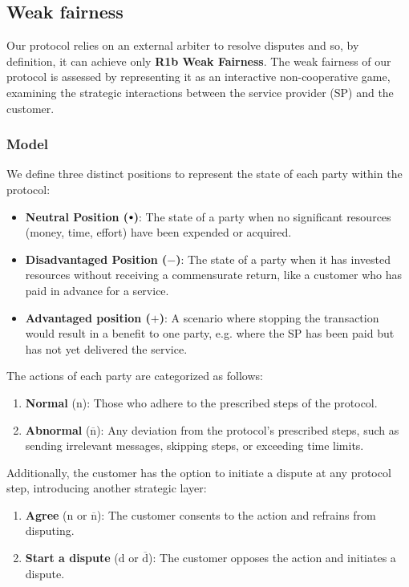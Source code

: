 \documentclass[pdftex,twocolumn,epjc3]{svjour3}
\newcommand{\normal}{\mathrm{n}}
\newcommand{\dispute}{\mathrm{d}}
\newcommand{\abnormal}{\overline{\mathrm{n}}}
\newcommand{\abdispute}{\overline{\mathrm{d}}}
\newcommand{\plus}{+}
\newcommand{\minus}{-}
\newcommand\neutral[1][.75]{\mathbin{\ThisStyle{\vcenter{\hbox{%
  \scalebox{#1}{$\SavedStyle\bullet$}}}}}%
}
\begin{document}
\subsection{Weak fairness}

Our protocol relies on an external arbiter to resolve disputes and so, by definition, it can achieve only \textbf{R1b Weak Fairness}. The weak fairness of our protocol is assessed by representing it as an interactive non-cooperative game, examining the strategic interactions between the service provider (SP) and the customer.

\subsubsection{Model}\label{sec:fairness-model}
We define three distinct positions to represent the state of each party within the protocol:


\begin{itemize}
\item \textbf{Neutral Position ($\neutral{}$)}: The state of a party when no significant resources (money, time, effort) have been expended or acquired.
\item \textbf{Disadvantaged Position ($\minus{}$)}: The state of a party when it has invested resources without receiving a commensurate return, like a customer who has paid in advance for a service.
\item \textbf{Advantaged position ($\plus{}$)}: A scenario where stopping the transaction would result in a benefit to one party, e.g. where the SP has been paid but has not yet delivered the service.
\end{itemize}

The actions of each party are categorized as follows:

\begin{enumerate}
\item \textbf{Normal} ($\normal{}$): Those who adhere to the prescribed steps of the protocol.
\item \textbf{Abnormal} ($\abnormal{}$): Any deviation from the protocol's prescribed steps, such as sending irrelevant messages, skipping steps, or exceeding time limits.
\end{enumerate}

Additionally, the customer has the option to initiate a dispute at any protocol step, introducing another strategic layer:

\begin{enumerate}
\def\labelenumi{\arabic{enumi}.}
\item \textbf{Agree} ($\normal{}$ or $\abnormal{}$): The customer consents to the action and refrains from disputing.
\item \textbf{Start a dispute} ($\dispute{}$ or $\abdispute{}$): The customer opposes the action and initiates a dispute.
\end{enumerate}
\end{document}
